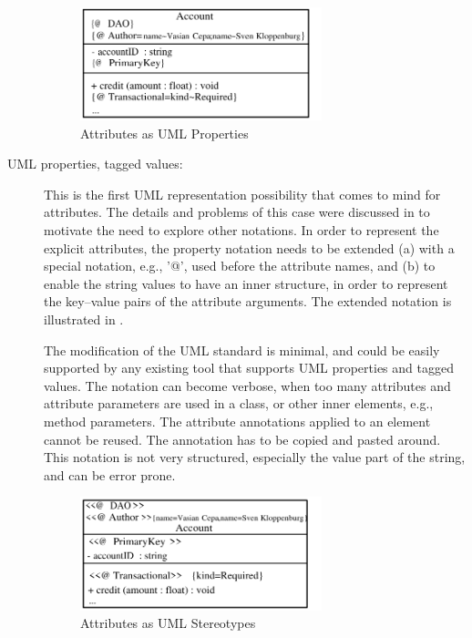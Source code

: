 \begin{description}

\begin{figure}[ht]
		\centering
		\includegraphics[width=7cm,height=!]{append1/properties}
	\caption{Attributes as UML Properties}
	\label{fig:tagged.values}
\end{figure}

\item[UML properties, tagged values:] This is the first UML representation possibility that comes to mind for attributes. The details and problems of this case were discussed in  to motivate the need to explore other notations. In order to represent the explicit attributes, the property notation needs to be extended (a) with a special notation, e.g., '@', used before the attribute names, and (b) to enable the string values to have an inner structure, in order to represent the key--value pairs of the attribute arguments. The extended notation is illustrated in .
  
  The modification of the UML standard is minimal, and could be easily supported by
  any existing tool that supports UML properties and tagged values. The
  notation can become verbose, when too many attributes and attribute
  parameters are used in a class, or other inner elements, e.g., method parameters. The attribute annotations applied to an element cannot be reused. The annotation has to be copied and pasted around. This notation is not very structured, especially the value part of the string, and can be error prone.

\begin{figure}[ht]
		\centering
		\includegraphics[width=7cm,height=!]{append1/stereotype}
	\caption{Attributes as UML Stereotypes}
	\label{fig:stereotype}
\end{figure}


\end{description}
